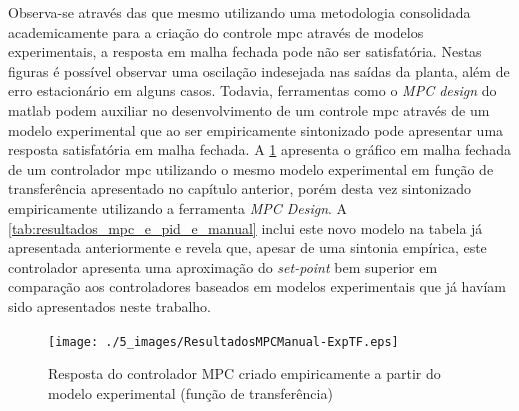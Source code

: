 Observa-se através das  que mesmo utilizando
uma metodologia consolidada academicamente para a criação do controle \acrshort{mpc} através de modelos
experimentais, a resposta em malha fechada pode não ser satisfatória. Nestas figuras é possível 
observar uma oscilação indesejada nas saídas da planta, além de erro estacionário em alguns casos.
Todavia, ferramentas como o \textit{MPC design} do \acrshort{matlab} podem auxiliar no desenvolvimento
de um controle \acrshort{mpc} através de um modelo experimental que ao ser empiricamente sintonizado
pode apresentar uma resposta satisfatória em malha fechada. A \cref{fig:resultadosmpcmanual-exptf}
apresenta o gráfico em malha fechada de um controlador \acrshort{mpc} utilizando o mesmo modelo experimental em
função de transferência apresentado no capítulo anterior, porém desta vez sintonizado empiricamente utilizando
a ferramenta \textit{MPC Design}. A \cref{tab:resultados_mpc_e_pid_e_manual} inclui este novo modelo 
na tabela já apresentada anteriormente e revela que, apesar de uma sintonia empírica, este controlador
apresenta uma aproximação do \textit{set-point} bem superior em comparação aos controladores baseados em 
modelos experimentais que já havíam sido apresentados neste trabalho.

\begin{figure}[!h]
	\caption{Resposta do controlador MPC criado empiricamente a partir do modelo experimental (função de transferência)}
	\begin{center}
		\texttt{[image: ./5\_images/ResultadosMPCManual-ExpTF.eps]} 
		\label{fig:resultadosmpcmanual-exptf}
	\end{center}
	\centering
\end{figure}

